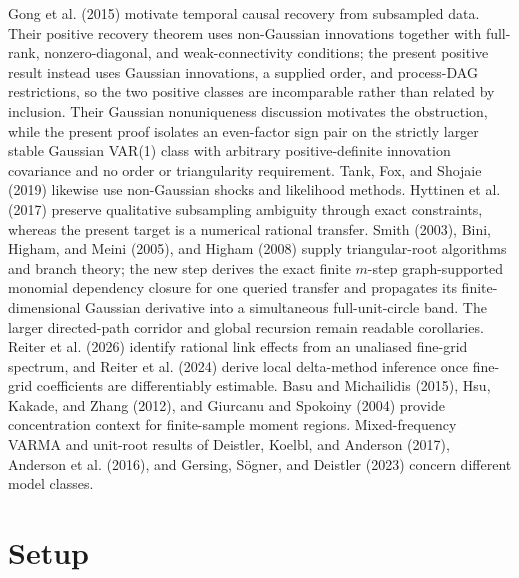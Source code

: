 \documentclass{article}
\begin{document}
Gong et al. (2015) motivate temporal causal recovery from subsampled data.  Their positive recovery theorem uses non-Gaussian innovations together with full-rank, nonzero-diagonal, and weak-connectivity conditions; the present positive result instead uses Gaussian innovations, a supplied order, and process-DAG restrictions, so the two positive classes are incomparable rather than related by inclusion.  Their Gaussian nonuniqueness discussion motivates the obstruction, while the present proof isolates an even-factor sign pair on the strictly larger stable Gaussian VAR(1) class with arbitrary positive-definite innovation covariance and no order or triangularity requirement.  Tank, Fox, and Shojaie (2019) likewise use non-Gaussian shocks and likelihood methods.  Hyttinen et al. (2017) preserve qualitative subsampling ambiguity through exact constraints, whereas the present target is a numerical rational transfer.  Smith (2003), Bini, Higham, and Meini (2005), and Higham (2008) supply triangular-root algorithms and branch theory; the new step derives the exact finite \(m\)-step graph-supported monomial dependency closure for one queried transfer and propagates its finite-dimensional Gaussian derivative into a simultaneous full-unit-circle band.  The larger directed-path corridor and global recursion remain readable corollaries.  Reiter et al. (2026) identify rational link effects from an unaliased fine-grid spectrum, and Reiter et al. (2024) derive local delta-method inference once fine-grid coefficients are differentiably estimable.  Basu and Michailidis (2015), Hsu, Kakade, and Zhang (2012), and Giurcanu and Spokoiny (2004) provide concentration context for finite-sample moment regions.  Mixed-frequency VARMA and unit-root results of Deistler, Koelbl, and Anderson (2017), Anderson et al. (2016), and Gersing, Sögner, and Deistler (2023) concern different model classes.

\section{Setup}
\end{document}
